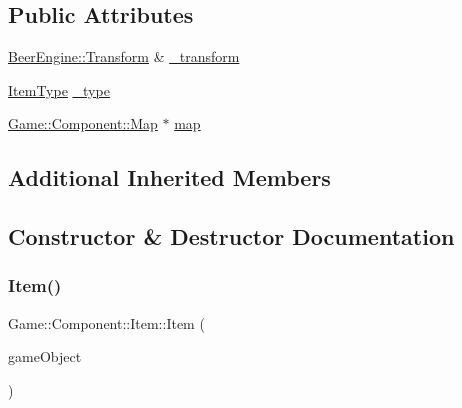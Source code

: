 \subsection*{Public Attributes}
\begin{DoxyCompactItemize}
\item 
\mbox{\hyperlink{class_beer_engine_1_1_transform}{Beer\+Engine\+::\+Transform}} \& \mbox{\hyperlink{class_game_1_1_component_1_1_item_a8fc387420298a557380ec1d9a39c964c}{\+\_\+transform}}
\item 
\mbox{\hyperlink{namespace_game_1_1_component_a95e2dc2d86d1c4789cc068f51d59ec29}{Item\+Type}} \mbox{\hyperlink{class_game_1_1_component_1_1_item_a4cb117bf44cb719e75921b7a4489646d}{\+\_\+type}}
\item 
\mbox{\hyperlink{class_game_1_1_component_1_1_map}{Game\+::\+Component\+::\+Map}} $\ast$ \mbox{\hyperlink{class_game_1_1_component_1_1_item_a4c483cc36f7f36b79cf1d0e13cd73afc}{map}}
\end{DoxyCompactItemize}
\subsection*{Additional Inherited Members}


\subsection{Constructor \& Destructor Documentation}
\mbox{\label{class_game_1_1_component_1_1_item_a55d47753d2ea3338e02453a2aeab78ff}} 
\subsubsection{\texorpdfstring{Item()}{Item()}}
{\footnotesize\ttfamily Game\+::\+Component\+::\+Item\+::\+Item (\begin{DoxyParamCaption}\item[{\mbox{\hyperlink{class_beer_engine_1_1_game_object}{Beer\+Engine\+::\+Game\+Object}} $\ast$}]{game\+Object }\end{DoxyParamCaption})}

\mbox{\label{class_game_1_1_component_1_1_item_a1ffc774ac5086f6f918d913f70e0322f}} 

